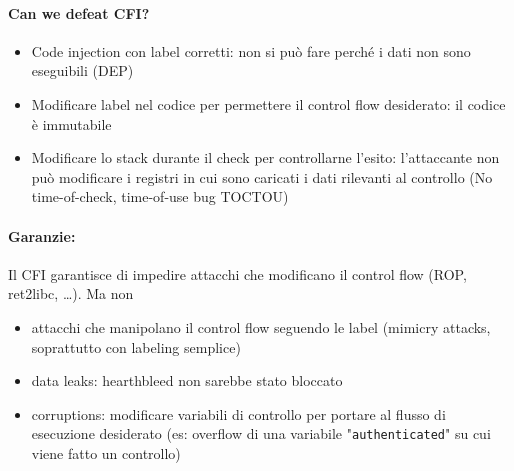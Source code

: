 \paragraph{Can we defeat CFI?}
\begin{itemize}
	\item Code injection con label corretti: non si può fare perché i dati non sono eseguibili (DEP)
	\item Modificare label nel codice per permettere il control flow desiderato: il codice è immutabile
	\item Modificare lo stack durante il check per controllarne l'esito: l'attaccante non può modificare i registri in cui sono caricati i dati rilevanti al controllo (No time-of-check, time-of-use bug TOCTOU)
\end{itemize} 

\paragraph{Garanzie:} Il CFI garantisce di impedire attacchi che modificano il control flow (ROP, ret2libc, \dots). Ma non 
\begin{itemize}
	\item attacchi che manipolano il control flow seguendo le label (mimicry attacks, soprattutto con labeling semplice)
	\item data leaks: hearthbleed non sarebbe stato bloccato
	\item corruptions: modificare variabili di controllo per portare al flusso di esecuzione desiderato (es: overflow di una variabile "\texttt{authenticated}" su cui viene fatto un controllo)
\end{itemize}